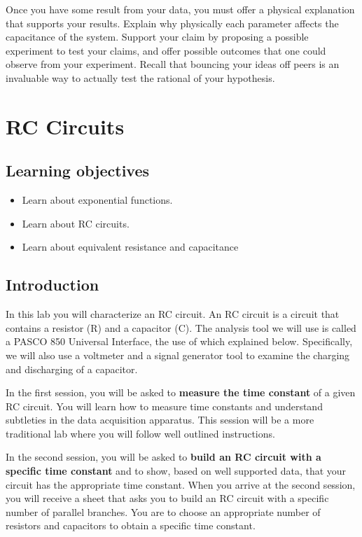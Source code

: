 \documentclass[12pt]{report}
\begin{document}
Once you have some result from your data, you must offer a physical explanation that supports your results. Explain why physically each parameter affects the capacitance of the system. Support your claim by proposing a possible experiment to test your claims, and offer possible outcomes that one could observe from your experiment. Recall that bouncing your ideas off peers is an invaluable way to actually test the rational of your hypothesis.


\chapter{RC Circuits}
\section{Learning objectives}
\begin{itemize}
\item Learn about exponential functions.
\item Learn about RC circuits.
\item Learn about equivalent resistance and capacitance
\end{itemize}

\section{Introduction}
In this lab you will characterize an RC circuit. An RC circuit is a circuit that contains a resistor (R) and a capacitor (C). The analysis tool we will use is called a PASCO 850 Universal Interface, the use of which explained below. Specifically, we will also use a voltmeter and a
signal generator tool to examine the charging and discharging of a capacitor. 

In the first session, you will be asked to \textbf{measure the time constant} of a given RC circuit. You will learn how to measure time constants and understand subtleties in the data acquisition apparatus. This session will be a more traditional lab where you will follow well outlined instructions. 

In the second session, you will be asked to \textbf{build an RC circuit with a specific time constant} and to show, based on well supported data, that your circuit has the appropriate time constant. When you arrive at the second session, you will receive a sheet that asks you to build an RC circuit with a specific number of parallel branches. You are to choose an appropriate number of resistors and capacitors to obtain a specific time constant.
\end{document}
